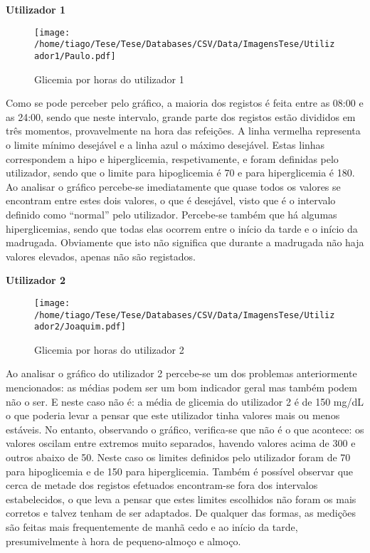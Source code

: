 \textbf{Utilizador 1}

\begin{figure}[H]
\centering
\texttt{[image: /home/tiago/Tese/Tese/Databases/CSV/Data/ImagensTese/Utilizador1/Paulo.pdf]}
\caption{Glicemia por horas do utilizador 1}
\end{figure}
Como se pode perceber pelo gráfico, a maioria dos registos é feita entre as 08:00 e as 24:00, sendo que neste intervalo, grande parte dos registos estão divididos em três momentos, provavelmente na hora das refeições. A linha vermelha representa o limite mínimo desejável e a linha azul o máximo desejável. Estas linhas correspondem a hipo e hiperglicemia, respetivamente, e foram definidas pelo utilizador, sendo que o limite para hipoglicemia é 70 e para hiperglicemia é 180. Ao analisar o gráfico percebe-se imediatamente que quase todos os valores se encontram entre estes dois valores, o que é desejável, visto que é o intervalo definido como ``normal'' pelo utilizador. Percebe-se também que há algumas hiperglicemias, sendo que todas elas ocorrem entre o início da tarde e o início da madrugada. Obviamente que isto não significa que durante a madrugada não haja valores elevados, apenas não são registados. 


\textbf{Utilizador 2}

\begin{figure}[H]
\centering
\texttt{[image: /home/tiago/Tese/Tese/Databases/CSV/Data/ImagensTese/Utilizador2/Joaquim.pdf]}
\caption{Glicemia por horas do utilizador 2}
\end{figure}
Ao analisar o gráfico do utilizador 2 percebe-se um dos problemas anteriormente mencionados: as médias podem ser um bom indicador geral mas também podem não o ser. E neste caso não é: a média de glicemia do utilizador 2 é de 150 mg/dL o que poderia levar a pensar que este utilizador tinha valores mais ou menos estáveis. No entanto, observando o gráfico, verifica-se que não é o que acontece: os valores oscilam entre extremos muito separados, havendo valores acima de 300 e outros abaixo de 50. Neste caso os limites definidos pelo utilizador foram de 70 para hipoglicemia e de 150 para hiperglicemia. Também é possível observar que cerca de metade dos registos efetuados encontram-se fora dos intervalos estabelecidos, o que leva a pensar que estes limites escolhidos não foram os mais corretos e talvez tenham de ser adaptados. De qualquer das formas, as medições são feitas mais frequentemente de manhã cedo e ao início da tarde, presumivelmente à hora de pequeno-almoço e almoço. 


